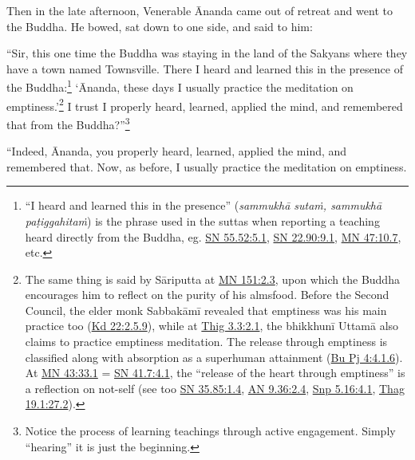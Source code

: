 \documentclass[12pt,openany]{book}%
\begin{document}
Then in the late afternoon, Venerable Ānanda came out of retreat and went to the Buddha. He bowed, sat down to one side, and said to him: 

“Sir, this one time the Buddha was staying in the land of the Sakyans where they have a town named Townsville. There I heard and learned this in the presence of the Buddha:\footnote{“I heard and learned this in the presence” (\textit{\textsanskrit{sammukhā} \textsanskrit{sutaṁ}, \textsanskrit{sammukhā} \textsanskrit{paṭiggahitaṁ}}) is the phrase used in the suttas when reporting a teaching heard directly from the Buddha, eg. \href{https://suttacentral.net/sn55.52/en/sujato\#5.1}{SN 55.52:5.1}, \href{https://suttacentral.net/sn22.90/en/sujato\#9.1}{SN 22.90:9.1}, \href{https://suttacentral.net/mn47/en/sujato\#10.7}{MN 47:10.7}, etc. } ‘Ānanda, these days I usually practice the meditation on emptiness.’\footnote{The same thing is said by \textsanskrit{Sāriputta} at \href{https://suttacentral.net/mn151/en/sujato\#2.3}{MN 151:2.3}, upon which the Buddha encourages him to reflect on the purity of his almsfood. Before the Second Council, the elder monk \textsanskrit{Sabbakāmī} revealed that emptiness was his main practice too (\href{https://suttacentral.net/pli-tv-kd22/en/sujato\#2.5.9}{Kd 22:2.5.9}), while at \href{https://suttacentral.net/thig3.3/en/sujato\#2.1}{Thig 3.3:2.1}, the \textsanskrit{bhikkhunī} \textsanskrit{Uttamā} also claims to practice emptiness meditation. The release through emptiness is classified along with absorption as a superhuman attainment (\href{https://suttacentral.net/pli-tv-bu-vb-pj4/en/sujato\#4.1.6}{Bu Pj 4:4.1.6}). At \href{https://suttacentral.net/mn43/en/sujato\#33.1}{MN 43:33.1} = \href{https://suttacentral.net/sn41.7/en/sujato\#4.1}{SN 41.7:4.1}, the “release of the heart through emptiness” is a reflection on not-self (see too \href{https://suttacentral.net/sn35.85/en/sujato\#1.4}{SN 35.85:1.4}, \href{https://suttacentral.net/an9.36/en/sujato\#2.4}{AN 9.36:2.4}, \href{https://suttacentral.net/snp5.16/en/sujato\#4.1}{Snp 5.16:4.1}, \href{https://suttacentral.net/thag19.1/en/sujato\#27.2}{Thag 19.1:27.2}). } I trust I properly heard, learned, applied the mind, and remembered that from the Buddha?”\footnote{Notice the process of learning teachings through active engagement. Simply “hearing” it is just the beginning. } 

“Indeed, Ānanda, you properly heard, learned, applied the mind, and remembered that. Now, as before, I usually practice the meditation on emptiness. 
\end{document}

